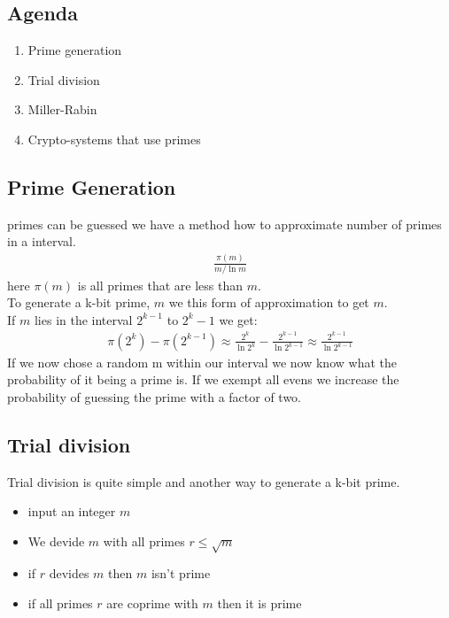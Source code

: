 

\subsection*{Agenda}
\begin{enumerate}
\item Prime generation
\item Trial division
\item Miller-Rabin
\item Crypto-systems that use primes
\end{enumerate}

\subsection{Prime Generation}
primes can be guessed we have a method how to approximate number of primes in a interval.
\begin{align*}
\frac{\pi (m)}{m/\ln m}
\end{align*}
here $\pi (m)$ is all primes that are less than $m$.\\
To generate a k-bit prime, $m$ we this form of approximation to get $m$.\\ If $m$ lies in the interval $2^{k-1}$ to $2^k-1$ we get:
\begin{align*}
\pi (2^k)-\pi (2^{k-1})\approx \frac{2^k}{\ln 2^k}-\frac{2^{k-1}}{\ln 2^{k-1}}\approx \frac{2^{k-1}}{\ln 2^{k-1}}
\end{align*}
If we now chose a random m within our interval we now know what the probability of it being a prime is. If we exempt all evens we increase the probability of guessing the prime with a factor of two.
\subsection{Trial division}
Trial division is quite simple and another way to generate a k-bit prime.
\begin{itemize}
\item input an integer $m$
\item We devide $m$ with all primes $r\le \sqrt{m}$
\item if $r$ devides $m$ then $m$ isn't prime
\item if all primes $r$ are coprime with $m$ then it is prime
\end{itemize}

